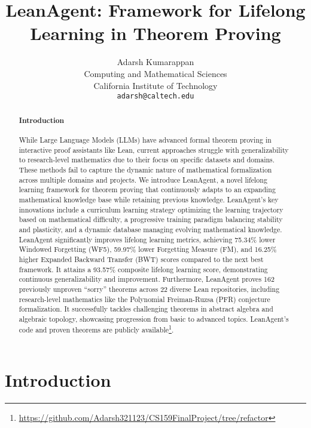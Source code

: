 \documentclass{article} %
\title{LeanAgent: Framework for Lifelong Learning in Theorem Proving}
\author{
  Adarsh Kumarappan \\
  Computing and Mathematical Sciences\\
  California Institute of Technology\\
  \texttt{adarsh@caltech.edu} \\
}
\begin{document}
\maketitle

\begin{abstract}
\paragraph{Introduction}
While Large Language Models (LLMs) have advanced formal theorem proving in interactive proof assistants like Lean, current approaches struggle with generalizability to research-level mathematics due to their focus on specific datasets and domains. These methods fail to capture the dynamic nature of mathematical formalization across multiple domains and projects. We introduce LeanAgent, a novel lifelong learning framework for theorem proving that continuously adapts to an expanding mathematical knowledge base while retaining previous knowledge. LeanAgent's key innovations include a curriculum learning strategy optimizing the learning trajectory based on mathematical difficulty, a progressive training paradigm balancing stability and plasticity, and a dynamic database managing evolving mathematical knowledge. LeanAgent significantly improves lifelong learning metrics, achieving 75.34\% lower Windowed Forgetting (WF5), 59.97\% lower Forgetting Measure (FM), and 16.25\% higher Expanded Backward Transfer (BWT) scores compared to the next best framework. It attains a 93.57\% composite lifelong learning score, demonstrating continuous generalizability and improvement. Furthermore, LeanAgent proves 162 previously unproven ``sorry'' theorems across 22 diverse Lean repositories, including research-level mathematics like the Polynomial Freiman-Ruzsa (PFR) conjecture formalization. It successfully tackles challenging theorems in abstract algebra and algebraic topology, showcasing progression from basic to advanced topics. LeanAgent's code and proven theorems are publicly available\footnote{\url{https://github.com/Adarsh321123/CS159FinalProject/tree/refactor}}.
\end{abstract}

\section{Introduction}
\end{document}
